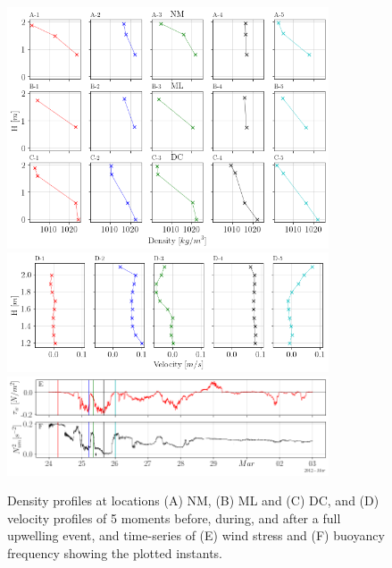 \documentclass[tesis.tex]{subfiles}
\begin{document}
    \begin{figure}[h!]
      \centering
      \includegraphics[width=0.85\textwidth]{Imagenes/perf.png}
      \includegraphics[width=0.85\textwidth]{Imagenes/vel.png}
      \includegraphics[width=0.85\textwidth]{Imagenes/n2.png}
      \caption{Density profiles at locations (A) NM, (B) ML and (C) DC, and (D) velocity profiles of 5 moments before, during, and after a full upwelling event, and time-series of (E) wind stress and (F) buoyancy frequency showing the plotted instants.}
      \label{fig:perfiles2}
    \end{figure}

    \newpage
    
\end{document}
